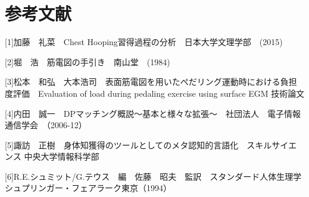 \documentclass[11pt,a4j,notitlepage]{jreport}
\begin{document}
\chapter*{参考文献}
[1]加藤　礼菜　Chest Hooping習得過程の分析　日本大学文理学部　(2015)

[2]堀　浩　筋電図の手引き　南山堂　(1984)

[3]松本　和弘　大本浩司　表面筋電図を用いたぺだリング運動時における負担度評価　Evaluation of load during pedaling exercise using surface EGM 技術論文

[4]内田　誠一　DPマッチング概説～基本と様々な拡張～　社団法人　電子情報通信学会　（2006-12）

[5]諏訪　正樹　身体知獲得のツールとしてのメタ認知的言語化　スキルサイエンス
中央大学情報科学部

[6]R.E.シュミット/G.テウス　編　佐藤　昭夫　監訳　スタンダード人体生理学  シュプリンガー・フェアラーク東京（1994）
\end{document}
